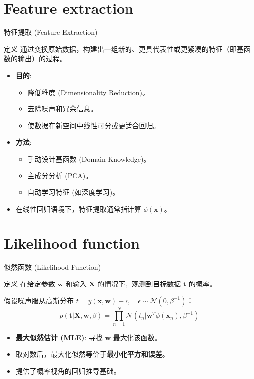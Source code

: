 \documentclass[12pt, aspectratio=169]{beamer}
\newcommand{\bw}{\mathbf{w}}
\newcommand{\bx}{\mathbf{x}}
\newcommand{\N}{\mathcal{N}}
\begin{document}
\section{Feature extraction}
\begin{frame}{特征提取 (Feature Extraction)}
    \begin{block}{定义}
        通过变换原始数据，构建出一组新的、更具代表性或更紧凑的特征（即基函数的输出）的过程。
    \end{block}
    
    \vspace{0.5cm}
    \begin{itemize}
        \item \textbf{目的}:
        \begin{itemize}
            \item 降低维度 (Dimensionality Reduction)。
            \item 去除噪声和冗余信息。
            \item 使数据在新空间中线性可分或更适合回归。
        \end{itemize}
        \item \textbf{方法}:
        \begin{itemize}
            \item 手动设计基函数 (Domain Knowledge)。
            \item 主成分分析 (PCA)。
            \item 自动学习特征 (如深度学习)。
        \end{itemize}
        \item 在线性回归语境下，特征提取通常指计算 $\phi(\bx)$。
    \end{itemize}
\end{frame}

\section{Likelihood function}
\begin{frame}{似然函数 (Likelihood Function)}
    \begin{block}{定义}
        在给定参数 $\bw$ 和输入 $\mathbf{X}$ 的情况下，观测到目标数据 $\mathbf{t}$ 的概率。
    \end{block}
    
    假设噪声服从高斯分布 $t = y(\bx, \bw) + \epsilon, \quad \epsilon \sim \N(0, \beta^{-1})$：
    \begin{equation*}
        p(\mathbf{t}|\mathbf{X}, \bw, \beta) = \prod_{n=1}^N \N(t_n | \bw^T \phi(\bx_n), \beta^{-1})
    \end{equation*}
    
    \vspace{0.5cm}
    \begin{itemize}
        \item \textbf{最大似然估计 (MLE)}: 寻找 $\bw$ 最大化该函数。
        \item 取对数后，最大化似然等价于\textbf{最小化平方和误差}。
        \item 提供了概率视角的回归推导基础。
    \end{itemize}
\end{frame}
\end{document}
